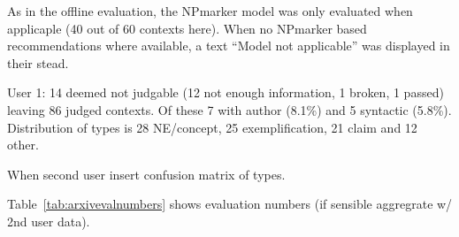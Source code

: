 As in the offline evaluation, the NPmarker model was only evaluated when applicaple (40 out of 60 contexts here). When no NPmarker based recommendations where available, a text ``Model not applicable'' was displayed in their stead.

User 1: 14 deemed not judgable (12 not enough information, 1 broken, 1 passed) leaving 86 judged contexts. Of these 7 with author (8.1\%) and 5 syntactic (5.8\%). Distribution of types is 28 NE/concept, 25 exemplification, 21 claim and 12 other.

When second user insert confusion matrix of types.

Table~\ref{tab:arxivevalnumbers} shows evaluation numbers (if sensible aggregrate w/ 2nd user data).

